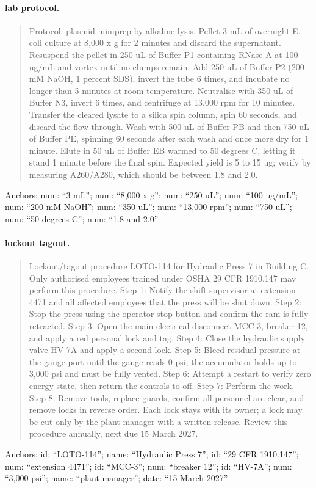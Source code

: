 \paragraph{lab protocol.}
\begin{quote}\small Protocol: plasmid miniprep by alkaline lysis. Pellet 3 mL of overnight E. coli culture at 8,000 x g for 2 minutes and discard the supernatant. Resuspend the pellet in 250 uL of Buffer P1 containing RNase A at 100 ug/mL and vortex until no clumps remain. Add 250 uL of Buffer P2 (200 mM NaOH, 1 percent SDS), invert the tube 6 times, and incubate no longer than 5 minutes at room temperature. Neutralise with 350 uL of Buffer N3, invert 6 times, and centrifuge at 13,000 rpm for 10 minutes. Transfer the cleared lysate to a silica spin column, spin 60 seconds, and discard the flow-through. Wash with 500 uL of Buffer PB and then 750 uL of Buffer PE, spinning 60 seconds after each wash and once more dry for 1 minute. Elute in 50 uL of Buffer EB warmed to 50 degrees C, letting it stand 1 minute before the final spin. Expected yield is 5 to 15 ug; verify by measuring A260/A280, which should be between 1.8 and 2.0.\end{quote}
\noindent\footnotesize Anchors: num: ``3 mL''; num: ``8,000 x g''; num: ``250 uL''; num: ``100 ug/mL''; num: ``200 mM NaOH''; num: ``350 uL''; num: ``13,000 rpm''; num: ``750 uL''; num: ``50 degrees C''; num: ``1.8 and 2.0''\normalsize

\paragraph{lockout tagout.}
\begin{quote}\small Lockout/tagout procedure LOTO-114 for Hydraulic Press 7 in Building C. Only authorised employees trained under OSHA 29 CFR 1910.147 may perform this procedure. Step 1: Notify the shift supervisor at extension 4471 and all affected employees that the press will be shut down. Step 2: Stop the press using the operator stop button and confirm the ram is fully retracted. Step 3: Open the main electrical disconnect MCC-3, breaker 12, and apply a red personal lock and tag. Step 4: Close the hydraulic supply valve HV-7A and apply a second lock. Step 5: Bleed residual pressure at the gauge port until the gauge reads 0 psi; the accumulator holds up to 3,000 psi and must be fully vented. Step 6: Attempt a restart to verify zero energy state, then return the controls to off. Step 7: Perform the work. Step 8: Remove tools, replace guards, confirm all personnel are clear, and remove locks in reverse order. Each lock stays with its owner; a lock may be cut only by the plant manager with a written release. Review this procedure annually, next due 15 March 2027.\end{quote}
\noindent\footnotesize Anchors: id: ``LOTO-114''; name: ``Hydraulic Press 7''; id: ``29 CFR 1910.147''; num: ``extension 4471''; id: ``MCC-3''; num: ``breaker 12''; id: ``HV-7A''; num: ``3,000 psi''; name: ``plant manager''; date: ``15 March 2027''\normalsize


